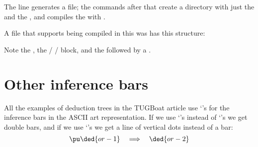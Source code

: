\documentclass[oneside]{article}
\def\msk{\medskip}
\begin{document}
\msk

The line  generates a 
file; the commands after that create a directory with just the
 and the , and compiles the  with
.

A  file that supports being compiled in this was has this
structure:

\msk

%
%
{\pu\foo}

\msk

Note the , the \co{\\ifluatex} /
\co{\\else} / \co{\\fi} block, and the 
followed by a \co{\\pu}.






%                                            

\section{Other inference bars}


All the examples of deduction trees in the TUGBoat article use
`\co{-}'s for the inference bars in the ASCII art representation. If
we use `\co{=}'s instead of `\co{-}'s we get double bars, and if we
use `\co{:}'s we get a line of vertical dots instead of a bar:
$$\pu \ded{or-1} \quad\Longrightarrow\quad \ded{or-2}$$
\end{document}
